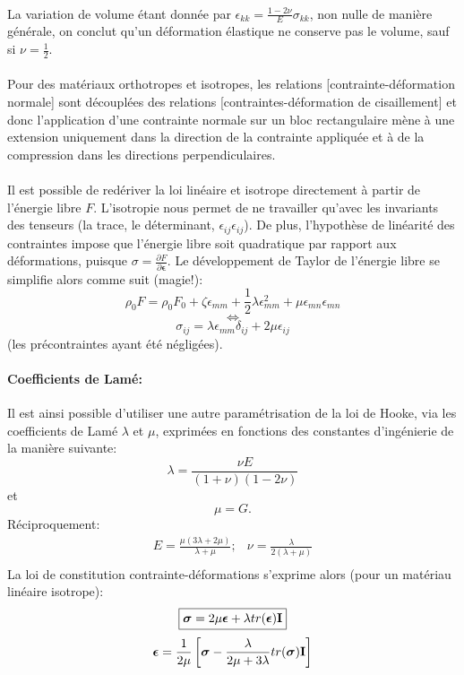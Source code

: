 \paragraph{}
La variation de volume étant donnée par $\epsilon_{kk}=\frac{1-2\nu}{E}\sigma_{kk}$, non nulle de manière générale, on conclut qu'un déformation élastique ne conserve pas le volume, sauf si $\nu=\frac{1}{2}$.
\paragraph{}
Pour des matériaux orthotropes et isotropes, les relations [contrainte-déformation normale] sont découplées des relations [contraintes-déformation de cisaillement] et donc l'application d'une contrainte normale sur un bloc rectangulaire mène à une extension uniquement dans la direction de la contrainte appliquée et à de la compression dans les directions perpendiculaires.
\paragraph{}
Il est possible de redériver la loi linéaire et isotrope directement à partir de l'énergie libre $F$. L'isotropie nous permet de ne travailler qu'avec les invariants des tenseurs (la trace, le déterminant, $\epsilon_{ij}\epsilon_{ij}$). De plus, l'hypothèse de linéarité des contraintes impose que l'énergie libre soit quadratique par rapport aux déformations, puisque $\sigma=\frac{\partial F}{\partial \boldsymbol{\epsilon}}$. Le développement de Taylor de l'énergie libre se simplifie alors comme suit (magie!):
$$\rho_0F=\rho_0F_0+\zeta\epsilon_{mm}+\frac{1}{2}\lambda\epsilon_{mm}^2+\mu\epsilon_{mn}\epsilon_{mn}$$
$$\Leftrightarrow$$
$$\sigma_{ij}=\lambda\epsilon_{mm}\delta_{ij}+2\mu\epsilon_{ij}$$ (les précontraintes ayant été négligées).
\paragraph{Coefficients de Lamé: }
Il est ainsi possible d'utiliser une autre paramétrisation de la loi de Hooke, via les coefficients de Lamé $\lambda$ et $\mu$, exprimées en fonctions des constantes d'ingénierie de la manière suivante:
$$\lambda=\frac{\nu E}{(1+\nu)(1-2\nu)}$$ et $$\mu=G.$$
Réciproquement:
$$\begin{array}{cc}
E=\frac{\mu(3\lambda+2\mu)}{\lambda + \mu};&\nu=\frac{\lambda}{2(\lambda+\mu)}\\
\end{array}$$
La loi de constitution contrainte-déformations s'exprime alors (pour un matériau linéaire isotrope):
$$\boxed{\boldsymbol{\sigma}=2\mu\boldsymbol{\epsilon}+\lambda tr(\boldsymbol{\epsilon})\textbf{I}}$$
$$\boldsymbol{\epsilon}=\frac{1}{2\mu}\left[\boldsymbol{\sigma}-\frac{\lambda}{2\mu+3\lambda}tr(\boldsymbol{\sigma})\textbf{I}\right]$$

